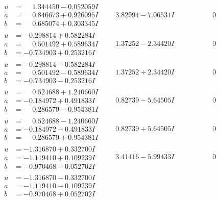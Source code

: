 \documentclass[1p]{elsarticle_modified}
\theoremstyle{definition}
\begin{document}
$$\begin{array}{c|c|c}
\begin{aligned}
u &= \phantom{-}1.344450 - 0.052059 I \\
a &= \phantom{-}0.846673 + 0.926095 I \\
b &= \phantom{-}0.685074 + 0.303345 I\end{aligned}
 & \phantom{-}3.82994 - 7.06531 I & \phantom{-0.000000 } 0 \\ \hline\begin{aligned}
u &= -0.298814 + 0.582284 I \\
a &= \phantom{-}0.501492 + 0.589634 I \\
b &= -0.734903 + 0.253216 I\end{aligned}
 & \phantom{-}1.37252 - 2.34420 I & \phantom{-0.000000 } 0 \\ \hline\begin{aligned}
u &= -0.298814 - 0.582284 I \\
a &= \phantom{-}0.501492 - 0.589634 I \\
b &= -0.734903 - 0.253216 I\end{aligned}
 & \phantom{-}1.37252 + 2.34420 I & \phantom{-0.000000 } 0 \\ \hline\begin{aligned}
u &= \phantom{-}0.524688 + 1.240660 I \\
a &= -0.184972 + 0.491833 I \\
b &= \phantom{-}0.286579 - 0.954381 I\end{aligned}
 & \phantom{-}0.82739 - 5.64505 I & \phantom{-0.000000 } 0 \\ \hline\begin{aligned}
u &= \phantom{-}0.524688 - 1.240660 I \\
a &= -0.184972 - 0.491833 I \\
b &= \phantom{-}0.286579 + 0.954381 I\end{aligned}
 & \phantom{-}0.82739 + 5.64505 I & \phantom{-0.000000 } 0 \\ \hline\begin{aligned}
u &= -1.316870 + 0.332700 I \\
a &= -1.119410 + 0.109239 I \\
b &= -0.970468 - 0.052702 I\end{aligned}
 & \phantom{-}3.41416 - 5.99433 I & \phantom{-0.000000 } 0 \\ \hline\begin{aligned}
u &= -1.316870 - 0.332700 I \\
a &= -1.119410 - 0.109239 I \\
b &= -0.970468 + 0.052702 I\end{aligned}

\end{array}$$
\end{document}
